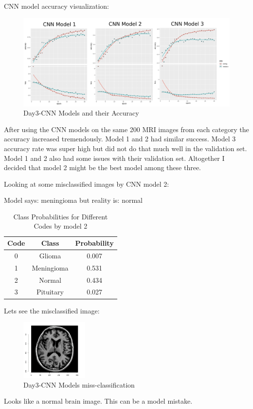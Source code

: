 \documentclass[letterpaper,11pt]{article}
\begin{document}
CNN model accuracy visualization:
\begin{figure}[H]
    \centering
    \includegraphics[width=1\textwidth]{Results/CNN models.jpg}
    \caption{Day3-CNN Models and their Accuracy}
    \label{fig:D3_cnn_models}
\end{figure}

After using the CNN models on the same 200 MRI images from each category the accuracy increased tremendously. Model 1 and 2 had similar success. Model 3 accuracy rate was super high but did not do that much well in the validation set. Model 1 and 2 also had some issues with their validation set. Altogether I decided that model 2 might be the best model among these three.

Looking at some misclassified images by CNN model 2:

Model says: meningioma but reality is: normal
\begin{table}[h!]
    \centering
    \begin{tabular}{|c|c|c|}
        \hline
        \textbf{Code} & \textbf{Class} & \textbf{Probability} \\ \hline
        0 & Glioma & 0.007 \\ \hline
        1 & Meningioma & 0.531 \\ \hline
        2 & Normal & 0.434 \\ \hline
        3 & Pituitary & 0.027 \\ \hline
    \end{tabular}
    \caption{Class Probabilities for Different Codes by model 2}
    \label{tab:class_probabilities}
\end{table}

Lets see the misclassified image:
\begin{figure}[H]
    \centering
    \includegraphics[width=0.3\textwidth]{Results/mri_image.jpg}
    \caption{Day3-CNN Models miss-classification}
    \label{fig:D3_cnn_models}
\end{figure}
Looks like a normal brain image. This can be a model mistake.
\end{document}
